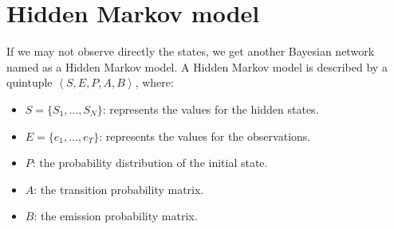 \section{Hidden Markov model}

If we may not observe directly the states, we get another Bayesian network named as a Hidden Markov model.
A Hidden Markov model is described by a quintuple $\left\langle S,E,P,A,B \right\rangle$, where: 
\begin{itemize}
    \item $S=\{S_1,\dots,S_N\}$: represents the values for the hidden states.
    \item $E=\{e_1,\dots,e_T\}$: represents the values for the observations. 
    \item $P$: the probability distribution of the initial state.
    \item $A$: the transition probability matrix.
    \item $B$: the emission probability matrix.
\end{itemize}
